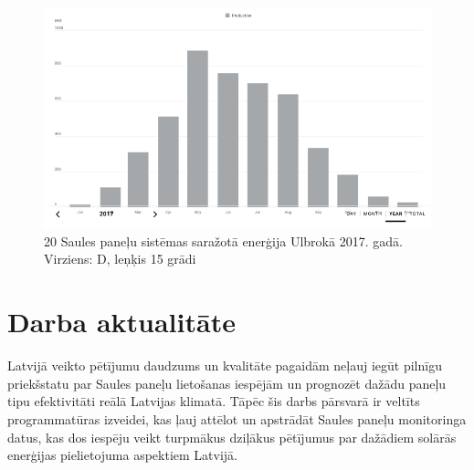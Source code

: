 \begin{figure}[h]
  \centering
  \includegraphics[width=\linewidth]{figures/misc/2017.png}
  \caption{20 Saules paneļu sistēmas saražotā enerģija Ulbrokā 2017. gadā. Virziens: D, leņķis 15 grādi \cite{fronius}}
  \label{fig:ulbroka}
\end{figure}

\section{Darba aktualitāte}

Latvijā veikto pētījumu daudzums un kvalitāte pagaidām neļauj iegūt pilnīgu priekšstatu par Saules paneļu lietošanas iespējām un prognozēt dažādu paneļu tipu efektivitāti reālā Latvijas klimatā. Tāpēc šis darbs pārsvarā ir veltīts programmatūras izveidei, kas ļauj attēlot un apstrādāt Saules paneļu monitoringa datus, kas dos iespēju veikt turpmākus dziļākus pētījumus par dažādiem solārās enerģijas pielietojuma aspektiem Latvijā.

